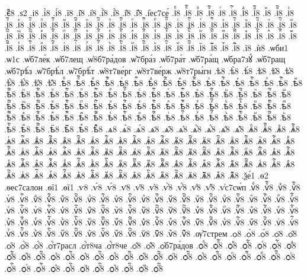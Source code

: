 {.є꙽҇8
.ѕ2
.і8
.і̀8
.і́8
.ї8
.і̑8
.і҆8
.і҆̀8
.і҆́8
.і҆̈8
.і҆̑8
.і҆ес7се́
.іⷠ8
.іⷠ҇8
.іⷡ8
.іⷡ҇8
.іⷢ8
.іⷢ҇8
.іⷣ8
.іⷣ҇8
.іⷤ8
.іⷤ҇8
.іⷥ8
.іⷥ҇8
.іⷦ8
.іⷦ҇8
.іⷧ8
.іⷧ҇8
.іⷨ8
.іⷨ҇8
.іⷩ8
.іⷩ҇8
.іⷪ8
.іⷪ҇8
.іⷫ8
.іⷫ҇8
.іⷬ8
.іⷬ҇8
.іⷭ8
.іⷭ҇8
.іⷮ8
.іⷮ҇8
.іⷯ8
.іⷯ҇8
.іⷰ8
.іⷰ҇8
.іⷱ8
.іⷱ҇8
.іⷲ8
.іⷲ҇8
.іⷳ8
.іⷳ҇8
.іⷴ8
.іⷴ҇8
.іⷵ8
.іⷵ҇8
.іⷶ8
.іⷶ҇8
.іⷷ8
.іⷷ҇8
.іⷸ8
.іⷸ҇8
.іⷹ8
.іⷹ҇8
.іⷺ8
.іⷺ҇8
.іⷻ8
.іⷻ҇8
.іⷼ8
.іⷼ҇8
.іⷽ8
.іⷽ҇8
.іⷾ8
.іⷾ҇8
.іⷿ8
.іⷿ҇8
.іꙴ8
.іꙴ҇8
.іꙵ8
.іꙵ҇8
.іꙶ8
.іꙶ҇8
.іꙷ8
.іꙷ҇8
.іꙸ8
.іꙸ҇8
.іꙹ8
.іꙹ҇8
.іꙺ8
.іꙺ҇8
.іꙻ8
.іꙻ҇8
.і꙼8
.і꙼҇8
.і꙽8
.і꙽҇8
.ї8
.ѝ8
.ѡби1
.ѡ1с
.ѡ҆б7ле́к
.ѡ҆б7лещ
.ѡ҆8б7ра́дов
.ѡ҆7бра́з
.ѡ҆б7ра́т
.ѡ҆б7ра́щ
.ѡ҆бра7зꙋ́
.ѡ҆б7ращ
.ѡ҆б7рѣ́з
.ѡ҆7брѣ́л
.ѡ҆7брѣ́т
.ѡ҆8т7ве́рг
.ѡ҆8т7ве́рж
.ѡ҆8т7ры́гн
.ѣ8
.ѣ̀8
.ѣ́8
.ѣ̈8
.ѣ̑8
.ѣ҆8
.ѣ҆̀8
.ѣ҆́8
.ѣ҆̈8
.ѣ҆̑8
.ѣⷠ8
.ѣⷠ҇8
.ѣⷡ8
.ѣⷡ҇8
.ѣⷢ8
.ѣⷢ҇8
.ѣⷣ8
.ѣⷣ҇8
.ѣⷤ8
.ѣⷤ҇8
.ѣⷥ8
.ѣⷥ҇8
.ѣⷦ8
.ѣⷦ҇8
.ѣⷧ8
.ѣⷧ҇8
.ѣⷨ8
.ѣⷨ҇8
.ѣⷩ8
.ѣⷩ҇8
.ѣⷪ8
.ѣⷪ҇8
.ѣⷫ8
.ѣⷫ҇8
.ѣⷬ8
.ѣⷬ҇8
.ѣⷭ8
.ѣⷭ҇8
.ѣⷮ8
.ѣⷮ҇8
.ѣⷯ8
.ѣⷯ҇8
.ѣⷰ8
.ѣⷰ҇8
.ѣⷱ8
.ѣⷱ҇8
.ѣⷲ8
.ѣⷲ҇8
.ѣⷳ8
.ѣⷳ҇8
.ѣⷴ8
.ѣⷴ҇8
.ѣⷵ8
.ѣⷵ҇8
.ѣⷶ8
.ѣⷶ҇8
.ѣⷷ8
.ѣⷷ҇8
.ѣⷸ8
.ѣⷸ҇8
.ѣⷹ8
.ѣⷹ҇8
.ѣⷺ8
.ѣⷺ҇8
.ѣⷻ8
.ѣⷻ҇8
.ѣⷼ8
.ѣⷼ҇8
.ѣⷽ8
.ѣⷽ҇8
.ѣⷾ8
.ѣⷾ҇8
.ѣⷿ8
.ѣⷿ҇8
.ѣꙴ8
.ѣꙴ҇8
.ѣꙵ8
.ѣꙵ҇8
.ѣꙶ8
.ѣꙶ҇8
.ѣꙷ8
.ѣꙷ҇8
.ѣꙸ8
.ѣꙸ҇8
.ѣꙹ8
.ѣꙹ҇8
.ѣꙺ8
.ѣꙺ҇8
.ѣꙻ8
.ѣꙻ҇8
.ѣ꙼8
.ѣ꙼҇8
.ѣ꙽8
.ѣ꙽҇8
.ѧ8
.ѧ̀8
.ѧ́8
.ѧ̈8
.ѧ̑8
.ѧ҆8
.ѧ҆̀8
.ѧ҆́8
.ѧ҆̈8
.ѧ҆̑8
.ѧⷠ8
.ѧⷠ҇8
.ѧⷡ8
.ѧⷡ҇8
.ѧⷢ8
.ѧⷢ҇8
.ѧⷣ8
.ѧⷣ҇8
.ѧⷤ8
.ѧⷤ҇8
.ѧⷥ8
.ѧⷥ҇8
.ѧⷦ8
.ѧⷦ҇8
.ѧⷧ8
.ѧⷧ҇8
.ѧⷨ8
.ѧⷨ҇8
.ѧⷩ8
.ѧⷩ҇8
.ѧⷪ8
.ѧⷪ҇8
.ѧⷫ8
.ѧⷫ҇8
.ѧⷬ8
.ѧⷬ҇8
.ѧⷭ8
.ѧⷭ҇8
.ѧⷮ8
.ѧⷮ҇8
.ѧⷯ8
.ѧⷯ҇8
.ѧⷰ8
.ѧⷰ҇8
.ѧⷱ8
.ѧⷱ҇8
.ѧⷲ8
.ѧⷲ҇8
.ѧⷳ8
.ѧⷳ҇8
.ѧⷴ8
.ѧⷴ҇8
.ѧⷵ8
.ѧⷵ҇8
.ѧⷶ8
.ѧⷶ҇8
.ѧⷷ8
.ѧⷷ҇8
.ѧⷸ8
.ѧⷸ҇8
.ѧⷹ8
.ѧⷹ҇8
.ѧⷺ8
.ѧⷺ҇8
.ѧⷻ8
.ѧⷻ҇8
.ѧⷼ8
.ѧⷼ҇8
.ѧⷽ8
.ѧⷽ҇8
.ѧⷾ8
.ѧⷾ҇8
.ѧⷿ8
.ѧⷿ҇8
.ѧꙴ8
.ѧꙴ҇8
.ѧꙵ8
.ѧꙵ҇8
.ѧꙶ8
.ѧꙶ҇8
.ѧꙷ8
.ѧꙷ҇8
.ѧꙸ8
.ѧꙸ҇8
.ѧꙹ8
.ѧꙹ҇8
.ѧꙺ8
.ѧꙺ҇8
.ѧꙻ8
.ѧꙻ҇8
.ѧ꙼8
.ѧ꙼҇8
.ѧ꙽8
.ѧ꙽҇8
.ѯе́1
.ѳ2
.ѳес7салон
.ѳї1
.ѳї1
.ѵ8
.ѵ̀8
.ѵ́8
.ѵ̈8
.ѵ̑8
.ѵ҆8
.ѵ҆̀8
.ѵ҆́8
.ѵ҆̈8
.ѵ҆̑8
.ѵ҆с7сѡ́п
.ѵⷠ8
.ѵⷠ҇8
.ѵⷡ8
.ѵⷡ҇8
.ѵⷢ8
.ѵⷢ҇8
.ѵⷣ8
.ѵⷣ҇8
.ѵⷤ8
.ѵⷤ҇8
.ѵⷥ8
.ѵⷥ҇8
.ѵⷦ8
.ѵⷦ҇8
.ѵⷧ8
.ѵⷧ҇8
.ѵⷨ8
.ѵⷨ҇8
.ѵⷩ8
.ѵⷩ҇8
.ѵⷪ8
.ѵⷪ҇8
.ѵⷫ8
.ѵⷫ҇8
.ѵⷬ8
.ѵⷬ҇8
.ѵⷭ8
.ѵⷭ҇8
.ѵⷮ8
.ѵⷮ҇8
.ѵⷯ8
.ѵⷯ҇8
.ѵⷰ8
.ѵⷰ҇8
.ѵⷱ8
.ѵⷱ҇8
.ѵⷲ8
.ѵⷲ҇8
.ѵⷳ8
.ѵⷳ҇8
.ѵⷴ8
.ѵⷴ҇8
.ѵⷵ8
.ѵⷵ҇8
.ѵⷶ8
.ѵⷶ҇8
.ѵⷷ8
.ѵⷷ҇8
.ѵⷸ8
.ѵⷸ҇8
.ѵⷹ8
.ѵⷹ҇8
.ѵⷺ8
.ѵⷺ҇8
.ѵⷻ8
.ѵⷻ҇8
.ѵⷼ8
.ѵⷼ҇8
.ѵⷽ8
.ѵⷽ҇8
.ѵⷾ8
.ѵⷾ҇8
.ѵⷿ8
.ѵⷿ҇8
.ѵꙴ8
.ѵꙴ҇8
.ѵꙵ8
.ѵꙵ҇8
.ѵꙶ8
.ѵꙶ҇8
.ѵꙷ8
.ѵꙷ҇8
.ѵꙸ8
.ѵꙸ҇8
.ѵꙹ8
.ѵꙹ҇8
.ѵꙺ8
.ѵꙺ҇8
.ѵꙻ8
.ѵꙻ҇8
.ѵ꙼8
.ѵ꙼҇8
.ѵ꙽8
.ѵ꙽҇8
.ѹ҆7стрем
.ѻ8
.ѻ̀8
.ѻ́8
.ѻ̈8
.ѻ̑8
.ѻ҆8
.ѻ҆̀8
.ѻ҆́8
.ѻ҆́т7расл
.ѻ҆́т8ча
.ѻ҆́т8че
.ѻ҆̈8
.ѻ҆̑8
.ѻ҆б7ра́дов
.ѻⷠ8
.ѻⷠ҇8
.ѻⷡ8
.ѻⷡ҇8
.ѻⷢ8
.ѻⷢ҇8
.ѻⷣ8
.ѻⷣ҇8
.ѻⷤ8
.ѻⷤ҇8
.ѻⷥ8
.ѻⷥ҇8
.ѻⷦ8
.ѻⷦ҇8
.ѻⷧ8
.ѻⷧ҇8
.ѻⷨ8
.ѻⷨ҇8
.ѻⷩ8
.ѻⷩ҇8
.ѻⷪ8
.ѻⷪ҇8
.ѻⷫ8
.ѻⷫ҇8
.ѻⷬ8
.ѻⷬ҇8
.ѻⷭ8
.ѻⷭ҇8
.ѻⷮ8
.ѻⷮ҇8
.ѻⷯ8
.ѻⷯ҇8
.ѻⷰ8
.ѻⷰ҇8
.ѻⷱ8
.ѻⷱ҇8
.ѻⷲ8
.ѻⷲ҇8
}
